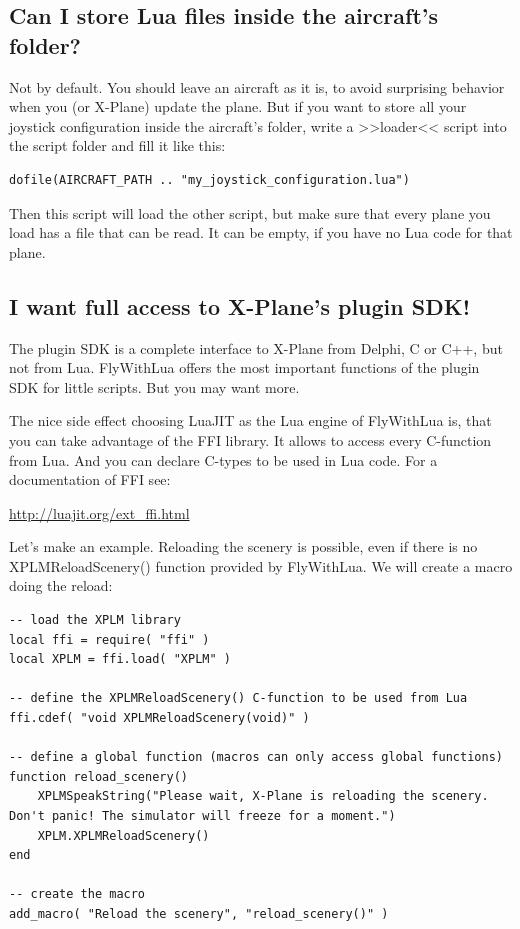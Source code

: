 \documentclass[11pt,parskip=half,a4paper]{scrartcl}
\begin{document}
\subsection{Can I store Lua files inside the aircraft's folder?}

Not by default. You should leave an aircraft as it is, to avoid surprising behavior when you (or X-Plane) update the plane. But if you want to store all your joystick configuration inside the aircraft's folder, write a >>loader<< script into the script folder and fill it like this:

\begin{lstlisting}[firstnumber=1]
dofile(AIRCRAFT_PATH .. "my_joystick_configuration.lua")
\end{lstlisting}

Then this script will load the other script, but make sure that every plane you load has a file that can be read. It can be empty, if you have no Lua code for that plane.

\subsection{I want full access to X-Plane's plugin SDK!}

The plugin SDK is a complete interface to X-Plane from Delphi, C or C++, but not from Lua. FlyWithLua offers the most important functions of the plugin SDK for little scripts. But you may want more.

The nice side effect choosing LuaJIT as the Lua engine of FlyWithLua is, that you can take advantage of the FFI library. It allows to access every C-function from Lua. And you can declare C-types to be used in Lua code. For a documentation of FFI see:

\url{http://luajit.org/ext_ffi.html}

Let's make an example. Reloading the scenery is possible, even if there is no XPLMReloadScenery() function provided by FlyWithLua. We will create a macro doing the reload:

\begin{lstlisting}[firstnumber=12]
-- load the XPLM library
local ffi = require( "ffi" )
local XPLM = ffi.load( "XPLM" )

-- define the XPLMReloadScenery() C-function to be used from Lua
ffi.cdef( "void XPLMReloadScenery(void)" )

-- define a global function (macros can only access global functions)
function reload_scenery()
    XPLMSpeakString("Please wait, X-Plane is reloading the scenery. Don't panic! The simulator will freeze for a moment.")
    XPLM.XPLMReloadScenery()
end

-- create the macro
add_macro( "Reload the scenery", "reload_scenery()" )
\end{lstlisting}
\end{document}
